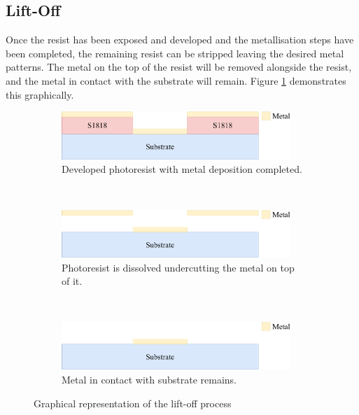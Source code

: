 \subsection{Lift-Off}
\label{sec:fab:liftoff}


Once the resist has been exposed and developed and the metallisation steps have been completed, the remaining resist can be stripped leaving the desired metal patterns. The metal on the top of the resist will be removed alongside the resist, and the metal in contact with the substrate will remain. Figure \ref{fig:lift-off} demonstrates this graphically.

\begin{figure}[!htb]
  \centering
  \begin{subfigure}[t]{0.5\textwidth}
      \centering
      \includegraphics[width=0.95\textwidth]{Figures/angus_bruce/lift_off_microandnano1.pdf}
      \caption{Developed photoresist with metal deposition completed.}
  \end{subfigure}%
  ~
  \begin{subfigure}[t]{0.5\textwidth}
      \centering
      \includegraphics[width=0.95\textwidth]{Figures/angus_bruce/lift_off_microandnano2.pdf}
      \caption{Photoresist is dissolved undercutting the metal on top of it.}
  \end{subfigure}
  ~
  \begin{subfigure}[t]{0.5\textwidth}
      \centering
      \includegraphics[width=0.95\textwidth]{Figures/angus_bruce/lift_off_microandnano3.pdf}
      \caption{Metal in contact with substrate remains.}
  \end{subfigure}
  \caption{Graphical representation of the lift-off process}
  \label{fig:lift-off}
\end{figure}

